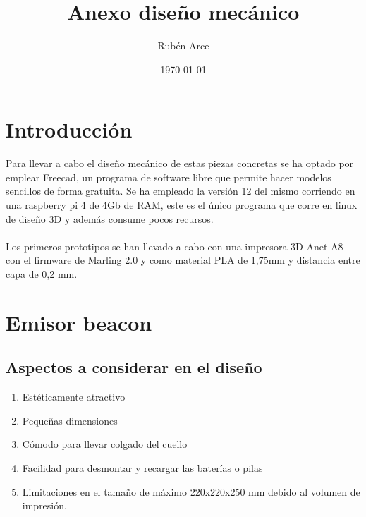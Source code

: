 \documentclass[a4paper ,12pt, onecolumn]{article}
\begin{document}
\title{Anexo diseño mecánico}

\author{Rubén Arce}
\date{\today}
\maketitle
\cleardoublepage
\tableofcontents
\cleardoublepage

\section{Introducción}
Para llevar a cabo el diseño mecánico de estas piezas concretas se ha optado por emplear Freecad, un
programa de software libre que permite hacer modelos sencillos de forma gratuita.
Se ha empleado la versión 12 del mismo corriendo en una raspberry pi 4 de 4Gb de RAM, este es el único
programa que corre en linux de diseño 3D y además consume pocos recursos.
\paragraph{}
Los primeros prototipos se han llevado a cabo con una impresora 3D Anet A8 con el firmware de Marling
2.0 y como material PLA de 1,75mm y distancia entre capa de 0,2 mm.
\section{Emisor beacon}
    \subsection{Aspectos a considerar en el diseño}
        \begin{enumerate}
            \item Estéticamente atractivo
            \item Pequeñas dimensiones
            \item Cómodo para llevar colgado del cuello
            \item Facilidad para desmontar y recargar las baterías o pilas
            \item Limitaciones en el tamaño de máximo 220x220x250 mm debido al volumen de impresión.
        \end{enumerate}
\end{document}
